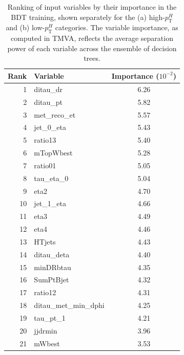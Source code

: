 \begin{table}[h]
  \centering
  \scriptsize
  \caption{Ranking of input variables by their importance in the BDT training, shown separately for the (a) high-$p_{\mathrm{T}}^{H}$ and (b) low-$p_{\mathrm{T}}^{H}$ categories. The variable importance, as computed in TMVA, reflects the average separation power of each variable across the ensemble of decision trees.}
  \renewcommand{\arraystretch}{1.05}
  \setlength{\tabcolsep}{4pt} %
  \begin{subtable}[t]{0.48\textwidth}
    \centering
    \begin{tabular}{r l c}
      \toprule
      \textbf{Rank} & \textbf{Variable} & \textbf{Importance} ($10^{-2}$) \\
      \midrule
       1 & ditau\_dr               & 6.26 \\
       2 & ditau\_pt               & 5.82 \\
       3 & met\_reco\_et           & 5.57 \\
       4 & jet\_0\_eta             & 5.43 \\
       5 & ratio13                 & 5.40 \\
       6 & mTopWbest               & 5.28 \\
       7 & ratio01                 & 5.05 \\
       8 & tau\_eta\_0             & 5.04 \\
       9 & eta2                    & 4.70 \\
      10 & jet\_1\_eta               & 4.66 \\
      11 & eta3                    & 4.49 \\
      12 & eta4                    & 4.46 \\
      13 & HTjets                  & 4.43 \\
      14 & ditau\_deta              & 4.40 \\
      15 & minDRbtau               & 4.35 \\
      16 & SumPtBjet               & 4.32 \\
      17 & ratio12                 & 4.31 \\
      18 & ditau\_met\_min\_dphi      & 4.25 \\
      19 & tau\_pt\_1                & 4.21 \\
      20 & jjdrmin                 & 3.96 \\
      21 & mWbest                  & 3.53 \\

\end{tabular}
\end{subtable}
\end{table}
